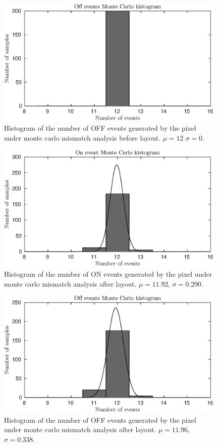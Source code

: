 \begin{figure}
    \center
    \includegraphics{pre-off-200-MC.eps}
    \caption{Histogram of the number of OFF events generated by the pixel under monte carlo mismatch analysis before layout. \(\mu=12\) \(\sigma=0\).}
    \label{fig:pre-off-MC}
\end{figure}
\begin{figure}
    \center
    \includegraphics{post-on-200-MC.eps}
    \caption{Histogram of the number of ON events generated by the pixel under monte carlo mismatch analysis after layout. \(\mu=11.92\), \(\sigma=0.290\).}
    \label{fig:post-on-MC}
\end{figure}
\begin{figure}
    \center
    \includegraphics{post-off-200-MC.eps}
    \caption{Histogram of the number of OFF events generated by the pixel under monte carlo mismatch analysis after layout. \(\mu=11.96\), \(\sigma=0.338\).}
    \label{fig:post-off-MC}
\end{figure}
\FloatBarrier
